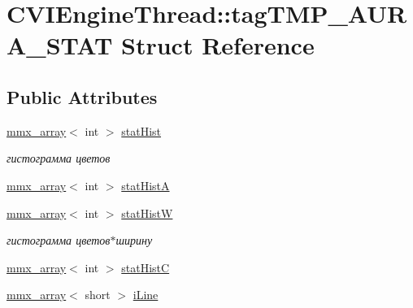 \hypertarget{struct_c_v_i_engine_thread_1_1tag_t_m_p___a_u_r_a___s_t_a_t}{\section{C\+V\+I\+Engine\+Thread\+:\+:tag\+T\+M\+P\+\_\+\+A\+U\+R\+A\+\_\+\+S\+T\+A\+T Struct Reference}
\label{struct_c_v_i_engine_thread_1_1tag_t_m_p___a_u_r_a___s_t_a_t}
}
\subsection*{Public Attributes}
\begin{DoxyCompactItemize}
\item 
\hyperlink{classmmx__array}{mmx\+\_\+array}$<$ int $>$ \hyperlink{struct_c_v_i_engine_thread_1_1tag_t_m_p___a_u_r_a___s_t_a_t_a1259267e7d38e77653ece8e1c5bb63a9}{stat\+Hist}
\begin{DoxyCompactList}\small\item\em гистограмма цветов \end{DoxyCompactList}\item 
\hyperlink{classmmx__array}{mmx\+\_\+array}$<$ int $>$ \hyperlink{struct_c_v_i_engine_thread_1_1tag_t_m_p___a_u_r_a___s_t_a_t_aa9dff3136c04a571f82c5d15deeca370}{stat\+Hist\+A}
\item 
\hyperlink{classmmx__array}{mmx\+\_\+array}$<$ int $>$ \hyperlink{struct_c_v_i_engine_thread_1_1tag_t_m_p___a_u_r_a___s_t_a_t_a0bb0bffd8702d64bca468c48409afc4d}{stat\+Hist\+W}
\begin{DoxyCompactList}\small\item\em гистограмма цветов$\ast$ширину \end{DoxyCompactList}\item 
\hyperlink{classmmx__array}{mmx\+\_\+array}$<$ int $>$ \hyperlink{struct_c_v_i_engine_thread_1_1tag_t_m_p___a_u_r_a___s_t_a_t_aba2ac6a4a2f4096c664860c7e600b890}{stat\+Hist\+C}
\item 
\hyperlink{classmmx__array}{mmx\+\_\+array}$<$ short $>$ \hyperlink{struct_c_v_i_engine_thread_1_1tag_t_m_p___a_u_r_a___s_t_a_t_afbc1d96e6f8f6ffcdd008147e7702e2f}{i\+Line}
\end{DoxyCompactItemize}


